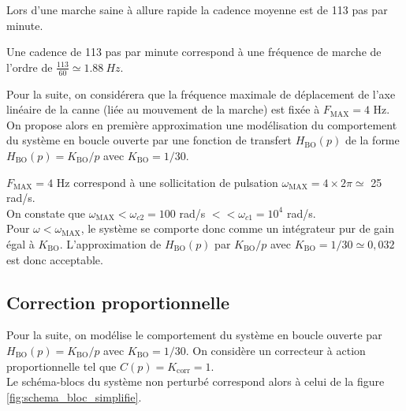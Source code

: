 \ifprof
\else

Lors d'une marche saine à allure rapide la cadence moyenne est de 113 pas par minute.
\fi


\ifprof
\begin{corrige}
Une cadence de 113 pas par minute correspond à une fréquence de marche de l'ordre de $\frac{113}{60} \simeq  \SI{1,88}{Hz}$.
 \end{corrige}
\fi

\ifprof
\else
\vspace*{1em}
Pour la suite, on considérera que la fréquence maximale de déplacement de l'axe linéaire de  la canne (liée au mouvement de la marche) est fixée à $F_{\text{MAX}} = 4$ Hz. On propose alors en première approximation une modélisation du comportement du système en boucle ouverte par une fonction de transfert $H_{\text{BO}}(p)$ de la forme $H_{\text{BO}}(p) = K_{\text{BO}}/p$ avec $K_{\text{BO}} = 1/30$.
\fi


\ifprof
\begin{corrige}
$F_{\text{MAX}} = 4$ Hz correspond à une sollicitation de pulsation $\omega_{\text{MAX}} = 4 \times 2 \pi \simeq $ 25 rad/s. \\
On constate que $\omega_{\text{MAX}}  <  \omega_{c2} = 100$ rad/s $<< \omega_{c1} = 10^{4}$ rad/s. \\
Pour $\omega < \omega_{\text{MAX}}$, le système se comporte donc comme un intégrateur pur de gain égal à $K_{\text{BO}}$. L'approximation de $H_{\text{BO}}(p)$ par $K_{\text{BO}}/p$ avec $K_{\text{BO}} = 1/30 \simeq 0,032$ est donc acceptable.
\end{corrige}
\fi

\ifprof
\else
\subsection*{Correction proportionnelle}

Pour la suite, on modélise le comportement du système en boucle ouverte par $H_{\text{BO}}(p) = K_{\text{BO}}/p$ avec $K_{\text{BO}} = 1/30$. On considère un correcteur à action proportionnelle tel que $C(p) = K_{\text{corr}} = 1$. \\
Le schéma-blocs du système non perturbé correspond alors à celui de la figure \ref{fig:schema_bloc_simplifie}.

